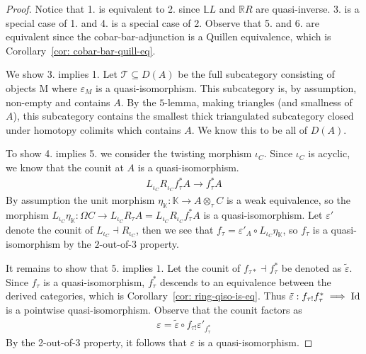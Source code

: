 \documentclass[../thesis.tex]{subfiles}
\begin{document}
            \begin{proof}
                Notice that 1. is equivalent to 2. since $\mathbb{L}L$ and $\mathbb{R}R$ are quasi-inverse. 3. is a special case of 1. and 4. is a special case of 2. Observe that 5. and 6. are equivalent since the cobar-bar-adjunction is a Quillen equivalence, which is Corollary~\ref{cor: cobar-bar-quill-eq}.

                We show 3. implies 1. Let $\mathcal{T}\subseteq D(A)$ be the full subcategory consisting of objects M where $\varepsilon_M$ is a quasi-isomorphism. This subcategory is, by assumption, non-empty and contains $A$. By the $5$-lemma, making triangles (and smallness of $A$), this subcategory contains the smallest thick triangulated subcategory closed under homotopy colimits which contains $A$. We know this to be all of $D(A)$.

                To show 4. implies 5. we consider the twisting morphism $\iota_C$. Since $\iota_C$ is acyclic, we know that the counit at $A$ is a quasi-isomorphism. 
                \begin{align*}
                    L_{\iota_C}R_{\iota_C}f_{\tau}^*A \rightarrow f_\tau^*A
                \end{align*}
                By assumption the unit morphism $\eta_\mathbb{K} : \mathbb{K} \rightarrow A \otimes_\tau C$ is a weak equivalence, so the morphism $L_{\iota_C}\eta_\mathbb{K} : \Omega C \rightarrow L_{\iota_C}R_\tau A = L_{\iota_C}R_{\iota_C}f_\tau^* A$ is a quasi-isomorphism. Let $\varepsilon'$ denote the counit of $L_{\iota_C} \dashv R_{\iota_C}$, then we see that $f_\tau = \varepsilon'_A \circ L_{\iota_C}\eta_\mathbb{K}$, so $f_\tau$ is a quasi-isomorphism by the $2$-out-of-$3$ property.

                It remains to show that $5$. implies $1$. Let the counit of $f_{\tau *} \dashv f_\tau^*$ be denoted as $\tilde{\varepsilon}$. Since $f_\tau$ is a quasi-isomorphism, $f_\tau^*$ descends to an equivalence between the derived categories, which is Corollary~\ref{cor: ring-qiso-is-eq}. Thus $\tilde{\varepsilon} : f_{\tau !}f_\tau^* \implies \tt{Id}$ is a pointwise quasi-isomorphism. Observe that the counit factors as
                \begin{align*}
                    \varepsilon = \tilde{\varepsilon} \circ f_{\tau !}\varepsilon'_{f_\tau^*}
                \end{align*}
                By the 2-out-of-3 property, it follows that $\varepsilon$ is a quasi-isomorphism.
            \end{proof}
\end{document}
